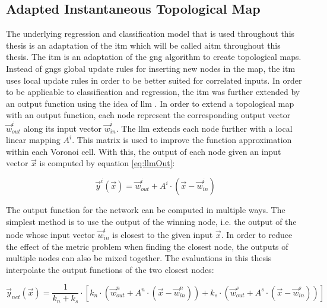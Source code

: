 \subsection{Adapted Instantaneous Topological Map \label{sec:ITM}}
The underlying regression and classification model that is used throughout this thesis is an adaptation of the \acrfull{itm} which will be called \acrfull{aitm} throughout this thesis.
The \gls{itm} \cite{itm} is an adaptation of the \gls{gng} \cite{gng} algorithm to create topological maps. Instead of \glspl{gng} global update rules for inserting new nodes in the map, the \gls{itm} uses local update rules in order to be better suited for correlated inputs. 
In order to be applicable to classification and regression, the \gls{itm} was further extended by an output function using the idea of \gls{llm} \cite{LLM}. In order to extend a topological map with an output function, each node represent the corresponding output vector $\vec{w}^i_{out}$ along its input vector $\vec{w}^i_{in}$. The \gls{llm} extends each node further with a local linear mapping $A^i$. This matrix is used to improve the function approximation within each Voronoi cell. With this, the output of each node given an input vector $\vec{x}$ is computed by equation \ref{eq:llmOut}:

\begin{equation}
\vec{y}^i(\vec{x}) = \vec{w}^i_{out} + A^i \cdot (\vec{x}-\vec{w}^i_{in})
\label{eq:llmOut}
\end{equation}

The output function for the network can be computed in multiple ways. The simplest method is to use the output of the winning node, i.e. the output of the node whose input vector $\vec{w}^i_{in}$ is closest to the given input $\vec{x}$. In order to reduce the effect of the metric problem when finding the closest node, the outputs of multiple nodes can also be mixed together. The evaluations in this thesis interpolate the output functions of the two closest nodes:

\begin{equation}
\vec{y}_{net}(\vec{x}) =  \frac{1}{k_n+k_s} \cdot \left[ k_n \cdot \left(\vec{w}^n_{out} + A^n \cdot \left(\vec{x}-\vec{w}^n_{in}\right)\right) + k_s \cdot  \left(\vec{w}^s_{out} + A^s \cdot \left(\vec{x}-\vec{w}^s_{in}\right)\right)\right]
\end{equation}

